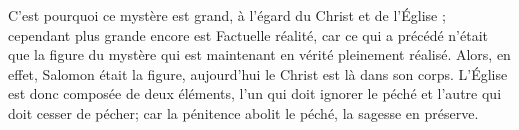 C'est pourquoi ce mystère est grand, à l'égard du Christ et de l'Église ; cependant plus grande encore est Factuelle réalité, car ce qui a précédé n’était que la figure du mystère qui est maintenant en vérité pleinement réalisé. Alors, en effet, Salomon était la figure, aujourd’hui le Christ est là dans son corps. L’Église est donc composée de deux éléments, l’un qui doit ignorer le péché et l’autre qui doit cesser de pécher; car la pénitence abolit le péché, la sagesse en préserve.
